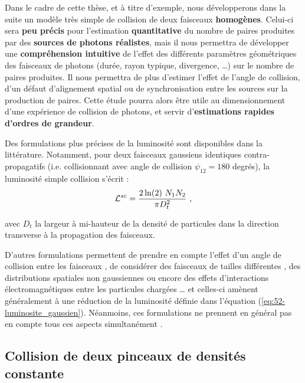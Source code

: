 \begin{refsection}
Dans le cadre de cette thèse, et à titre d'exemple, nous développerons dans la suite un modèle très simple de collision de deux faisceaux \textbf{homogènes}. Celui-ci sera \textbf{peu précis} pour l'estimation \textbf{quantitative} du nombre de paires produites par des \textbf{sources de photons réalistes}, mais il nous permettra de développer une \textbf{compréhension intuitive} de l'effet des différents paramètres géométriques des faisceaux de photons (durée, rayon typique, divergence, …) sur le nombre de paires produites. Il nous permettra de plus d'estimer l'effet de l'angle de collision, d'un défaut d'alignement spatial ou de synchronisation entre les sources sur la production de paires. Cette étude pourra alors être utile au dimensionnement d'une expérience de collision de photons, et servir d'\textbf{estimations rapides d'ordres de grandeur}. 

Des formulations plus précises de la luminosité sont disponibles dans la littérature. Notamment, pour deux faisceaux gaussiens identiques contra-propagatifs (i.e. collisionnant avec angle de collision $\psi_{12}=180$ degrés), la luminosité simple collision s'écrit \parencite{herr_2006} :
\begin{equation}
    \mathcal{L}^{sc} = \dfrac{2 \ln(2) ~ N_1 N_2}{\pi D_t^2} ~ \rm ,
    \label{eq:52-luminosite_gaussien}
\end{equation}

avec $D_t$ la largeur à mi-hauteur de la densité de particules dans la direction transverse à la propagation des faisceaux.

D'autres formulations permettent de prendre en compte l'effet d'un angle de collision entre les faisceaux \parencite{hirata_1995}, de considérer des faisceaux de tailles différentes \parencite{meshkov_2018}, des distributions spatiales non gaussiennes ou encore des effets d'interactions électromagnétiques entre les particules chargées \parencite{herr_2006} … et celles-ci amènent généralement à une réduction de la luminosité définie dans l'équation (\ref{eq:52-luminosite_gaussien}). Néanmoins, ces formulations ne prennent en général pas en compte tous ces aspects simultanément \parencite{meshkov_2018}.

\subsection{Collision de deux pinceaux de densités constante}


\end{refsection}
